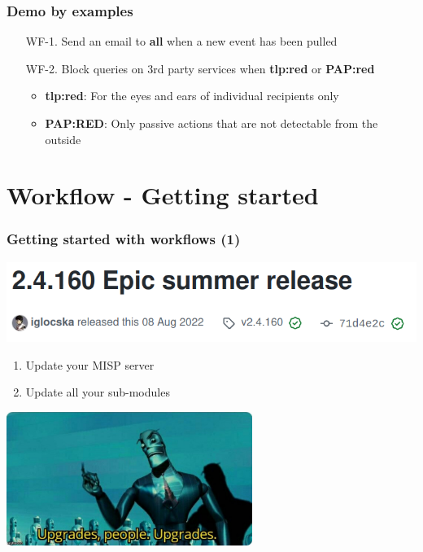 \begin{frame}
    \frametitle{Demo by examples}
    \begin{enumerate}
        \item[WF-1.] Send an email to \textbf{all} when a new event has been pulled
        \vspace*{2em}
        \item[WF-2.] Block queries on 3rd party services when \textbf{tlp:red} or \textbf{PAP:red}
        \begin{itemize}
            \item \textbf{tlp:red}: For the eyes and ears of individual recipients only
            \item \textbf{PAP:RED}: Only passive actions that are not detectable from the outside
        \end{itemize}
    \end{enumerate}
\end{frame}

\section{Workflow - Getting started}
\begin{frame}
    \frametitle{Getting started with workflows (1)}
    \begin{center}
        \includegraphics[width=0.9\linewidth]{pictures/workflow-release.png}
    \end{center}
    \begin{enumerate}
        \item Update your MISP server
        \item Update all your sub-modules
    \end{enumerate}
    \begin{center}
        \includegraphics[width=0.6\textwidth]{pictures/upgrade-people.jpeg}
    \end{center}
\end{frame}

